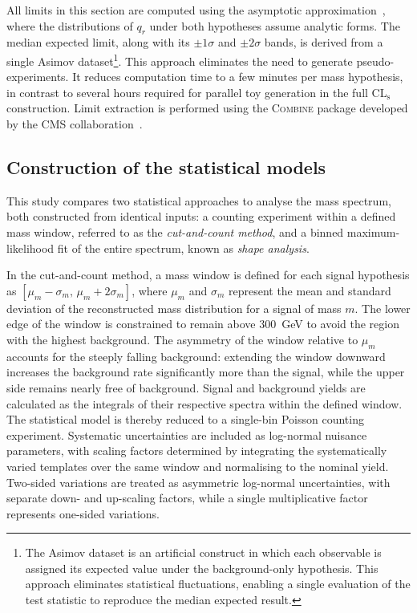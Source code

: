 \vspace{0.5 cm}

All limits in this section are computed using the asymptotic approximation~\cite{AsymptoticPaper}, where the distributions of $q_r$ under both hypotheses assume analytic forms. The median expected limit, along with its $\pm1\sigma$ and $\pm2\sigma$ bands, is derived from a single Asimov dataset\footnote{The Asimov dataset is an artificial construct in which each observable is assigned its expected value under the background-only hypothesis. This approach eliminates statistical fluctuations, enabling a single evaluation of the test statistic to reproduce the median expected result.}. This approach eliminates the need to generate pseudo-experiments. It reduces computation time to a few minutes per mass hypothesis, in contrast to several hours required for parallel toy generation in the full CL$_\text{s}$ construction. Limit extraction is performed using the \textsc{Combine} package developed by the CMS collaboration~\cite{CombinePaper}.


\subsection{Construction of the statistical models}
\label{sec:limits:models}

This study compares two statistical approaches to analyse the mass spectrum, both constructed from identical inputs: a counting experiment within a defined mass window, referred to as the \textit{cut-and-count method}, and a binned maximum-likelihood fit of the entire spectrum, known as \textit{shape analysis}.

\vspace{0.5 cm}

In the cut-and-count method, a mass window is defined for each signal hypothesis as $[\mu_m - \sigma_m,\, \mu_m + 2\sigma_m]$, where $\mu_m$ and $\sigma_m$ represent the mean and standard deviation of the reconstructed mass distribution for a signal of mass $m$. The lower edge of the window is constrained to remain above $300$~GeV to avoid the region with the highest background. The asymmetry of the window relative to $\mu_m$ accounts for the steeply falling background: extending the window downward increases the background rate significantly more than the signal, while the upper side remains nearly free of background. Signal and background yields are calculated as the integrals of their respective spectra within the defined window. The statistical model is thereby reduced to a single-bin Poisson counting experiment. Systematic uncertainties are included as log-normal nuisance parameters, with scaling factors determined by integrating the systematically varied templates over the same window and normalising to the nominal yield. Two-sided variations are treated as asymmetric log-normal uncertainties, with separate down- and up-scaling factors, while a single multiplicative factor represents one-sided variations.

